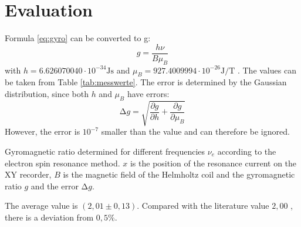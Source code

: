 \section{Evaluation}
Formula \ref{eq:gyro} can be converted to g:
\begin{equation}
  g=\frac{h\nu}{B\mu_{B}}
\end{equation}
with $h=6.626070040\cdot10^{-34}\si{\joule\second}$ \cite{3} and $\mu_B=927.4009994\cdot10^{-26}\si{\joule\per\tesla}$ \cite{2}.
The values can be taken from Table \ref{tab:messwerte}.
The error is determined by the Gaussian distribution, since both $h$ and $\mu_B$ have errors:
\begin{equation}
  \increment g = \sqrt{\frac{\partial g}{\partial h}+\frac{\partial g}{\partial \mu_B}}
\end{equation}
However, the error is $10^{-7}$ smaller than the value and can therefore be ignored.
\begin{table}
  \centering
  \caption{Gyromagnetic ratio determined for different frequencies $\nu_e$ according to the electron spin resonance method.
  $x$ is the position of the resonance current on the XY recorder,
  $B$ is the magnetic field of the Helmholtz coil and the gyromagnetic ratio $g$ and the error $\increment g$.}
  \label{tab:messwerte}
\end{table}
The average value is $(2,01\pm0,13)$. Compared with the literature value $2,00$ , there is a deviation from $0,5\%$.
